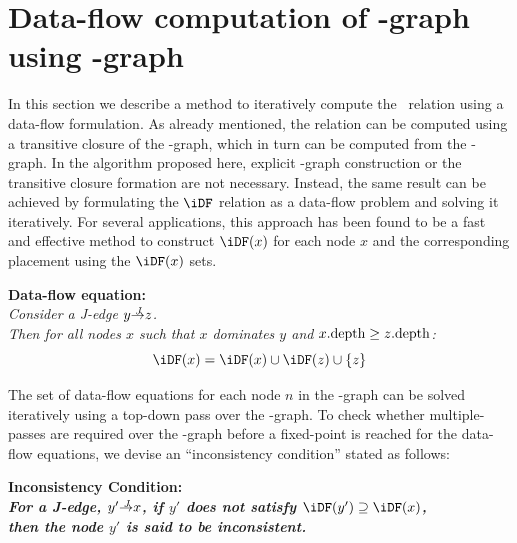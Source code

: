 {\section{Data-flow computation of \iDF-graph using \DJ-graph}

In this section we describe a method to iteratively compute the \iDF~relation using a data-flow formulation. 
As already mentioned, the \iDF relation can be computed using a transitive closure of the \DF-graph, which in turn can be computed from the \DJ-graph. 
In the algorithm proposed here, explicit \DF-graph construction or the transitive closure formation are not necessary. 
Instead, the same result can be achieved by formulating the $\iDF$ relation as a data-flow problem and solving it iteratively. 
For several applications, this approach has been found to be a fast and effective method to construct $\iDF(x)$ for each node $x$ and the corresponding \phifun placement using the $\iDF(x)$ sets.

\begin{center}
  \textbf{Data-flow equation:}\\
  {\it 
  Consider a J-edge $y \st{J} z$.\\
  Then for all nodes $x$ such that $x$ dominates $y$ and $x.\textrm{depth} \geq z.\textrm{depth}$:
  $$\iDF(x) = \iDF(x) \cup \iDF(z) \cup \{z\}$$}
\end{center}

The set of data-flow equations for each node $n$ in the \DJ-graph can be solved iteratively using a top-down pass over the \DJ-graph. 
To check whether multiple-passes are required over the \DJ-graph before a fixed-point is reached for the data-flow equations, we devise an ``inconsistency condition'' stated as follows:

\begin{center}
\bf{Inconsistency Condition:}\\
\it{For a J-edge, $y' \st{J} x$, if $y'$ does not satisfy
$\iDF(y')\supseteq \iDF(x)$,\\ then the node $y'$ is said to be inconsistent}. 
\end{center}

}
